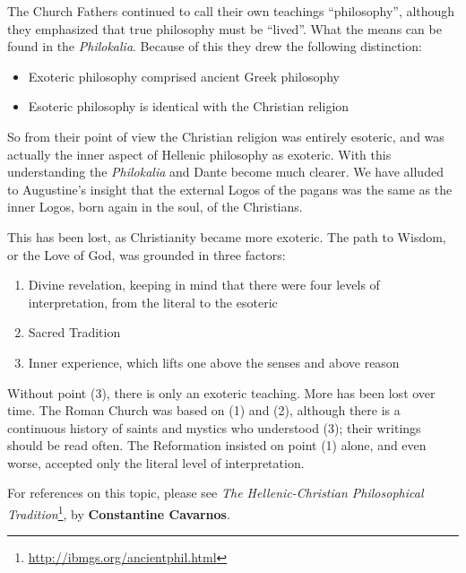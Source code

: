 The Church Fathers continued to call their own teachings ``philosophy'', although they emphasized that true philosophy must be ``lived''. What the means can be found in the \emph{Philokalia}. Because of this they drew the following distinction:

\begin{itemize}


\item Exoteric philosophy comprised ancient Greek philosophy

\item Esoteric philosophy is identical with the Christian religion
\end{itemize}


So from their point of view the Christian religion was entirely esoteric, and was actually the inner aspect of Hellenic philosophy as exoteric. With this understanding the \emph{Philokalia} and Dante become much clearer. We have alluded to Augustine's insight that the external Logos of the pagans was the same as the inner Logos, born again in the soul, of the Christians.

This has been lost, as Christianity became more exoteric. The path to Wisdom, or the Love of God, was grounded in three factors:

\begin{enumerate}


\item Divine revelation, keeping in mind that there were four levels of interpretation, from the literal to the esoteric

\item Sacred Tradition

\item Inner experience, which lifts one above the senses and above reason
\end{enumerate}


Without point (3), there is only an exoteric teaching. More has been lost over time. The Roman Church was based on (1) and (2), although there is a continuous history of saints and mystics who understood (3); their writings should be read often. The Reformation insisted on point (1) alone, and even worse, accepted only the literal level of interpretation.

For references on this topic, please see \textit{The Hellenic-Christian Philosophical Tradition}\footnote{\url{http://ibmgs.org/ancientphil.html}}, by \textbf{Constantine Cavarnos}.



